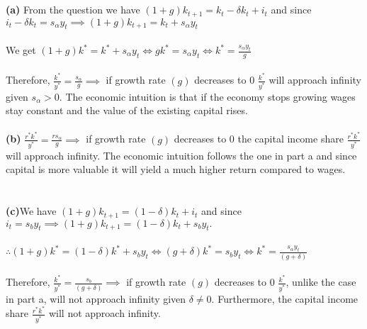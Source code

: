 \documentclass[11zpt]{article}
\newenvironment{problem}[2][Problem]{\begin{trivlist}
\item[\hskip \labelsep {\bfseries #1}\hskip \labelsep {\bfseries #2.}]}{\end{trivlist}}
\begin{document}
\begin{problem}{4}.
\\
\\
\textbf{(a)} From the question we have $(1+ g) k_{t+1} = k_t - \delta k_t + i_t $ and since $ i_t - \delta k_t = s_\alpha y_t \implies (1+ g) k_{t+1} = k_t + s_\alpha y_t $
\\
\\
We get $ (1 + g) k^* = k^* + s_\alpha y_t  \iff g k^* =  s_\alpha y_t \iff  k^* =  \frac{s_\alpha y_t}{g}$
\\
\\
Therefore, $\frac{k^*}{y^*} = \frac{s_\alpha}{g} \implies $ if growth rate $ (g) $ decreases to 0 $\frac{k^*}{y^*} $ will approach infinity given $s_\alpha > 0 $. The economic intuition is that if the economy stops growing wages stay constant and the value of the existing capital rises.  
\\
\\
\textbf{(b)} $\frac{r^* k^*}{y^*} = \frac{r s_\alpha}{g} \implies $ if growth rate $ (g) $ decreases to 0 the capital income share $\frac{r^* k^*}{y^*} $ will approach infinity. The economic intuition follows the one in part a and since capital is more valuable it will yield a much higher return compared to wages. 
\\
\\
\\
\textbf{(c)}We have $(1+ g) k_{t+1} = (1 - \delta) k_t + i_t $ and since $ i_t  = s_b y_t \implies (1+ g) k_{t+1} = (1 - \delta) k_t + s_b y_t. $
\\
\\
$\therefore  (1 + g) k^* = (1 - \delta) k^* + s_b y_t \iff (g + \delta) k^* =  s_b y_t \iff  k^* =  \frac{s_\alpha y_t}{(g + \delta)}$
\\
\\
Therefore, $\frac{k^*}{y^*} = \frac{s_b}{(g + \delta)} \implies $ if growth rate $ (g) $ decreases to 0 $\frac{k^*}{y^*} $, unlike the case in part a, will not approach infinity given $ \delta \neq 0$. Furthermore, the  capital income share $\frac{r^* k^*}{y^*} $ will not approach infinity.
\end{problem}
\end{document}
